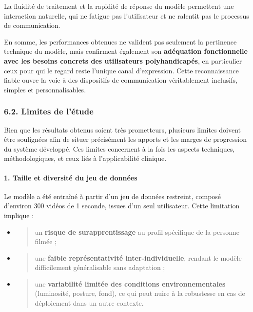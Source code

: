 \documentclass[
]{article}
\begin{document}
La fluidité de traitement et la rapidité de réponse du modèle permettent une interaction naturelle, qui ne fatigue pas l'utilisateur et ne ralentit pas le processus de communication.

En somme, les performances obtenues ne valident pas seulement la pertinence technique du modèle, mais confirment également son \textbf{adéquation fonctionnelle avec les besoins concrets des utilisateurs polyhandicapés}, en particulier ceux pour qui le regard reste l'unique canal d'expression. Cette reconnaissance fiable ouvre la voie à des dispositifs de communication véritablement inclusifs, simples et personnalisables.

\hypertarget{limites-de-luxe9tude}{%
\subsubsection{6.2. Limites de l'étude}\label{limites-de-luxe9tude}}

Bien que les résultats obtenus soient très prometteurs, plusieurs limites doivent être soulignées afin de situer précisément les apports et les marges de progression du système développé. Ces limites concernent à la fois les aspects techniques, méthodologiques, et ceux liés à l'applicabilité clinique.

\hypertarget{taille-et-diversituxe9-du-jeu-de-donnuxe9es}{%
\paragraph{\texorpdfstring{\textbf{1. Taille et diversité du jeu de données}}{1. Taille et diversité du jeu de données}}\label{taille-et-diversituxe9-du-jeu-de-donnuxe9es}}

Le modèle a été entraîné à partir d'un jeu de données restreint, composé d'environ 300 vidéos de 1 seconde, issues d'un seul utilisateur. Cette limitation implique :

\begin{itemize}
\item
  \begin{quote}
  un \textbf{risque de surapprentissage} au profil spécifique de la personne filmée ;
  \end{quote}
\item
  \begin{quote}
  une \textbf{faible représentativité inter-individuelle}, rendant le modèle difficilement généralisable sans adaptation ;
  \end{quote}
\item
  \begin{quote}
  une \textbf{variabilité limitée des conditions environnementales} (luminosité, posture, fond), ce qui peut nuire à la robustesse en cas de déploiement dans un autre contexte.
  \end{quote}
\end{itemize}
\end{document}

